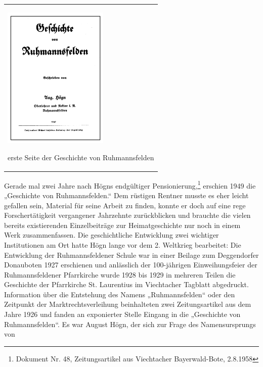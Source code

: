 \begin{flushleft}
\tablefirsthead{}
\tablehead{}
\tabletail{}
\tablelasttail{}
\begin{supertabular}{m{5.2310004cm}}

\begin{center}

\includegraphics[width=4.995cm,height=6.833cm]{pictures/zulassungsarbeit-img040.png}

\end{center}
erste Seite der Geschichte von
Ruhmannsfelden\\
\end{supertabular}
\end{flushleft}
Gerade mal zwei Jahre nach Högns endgültiger Pensionierung,\footnote{
Dokument Nr. 48, Zeitungsartikel aus Viechtacher Bayerwald-Bote,
2.8.1958} erschien 1949 die „Geschichte von Ruhmannsfelden.“ Dem
rüstigen Rentner musste es eher leicht gefallen sein, Material für
seine Arbeit zu finden, konnte er doch auf eine rege Forschertätigkeit
vergangener Jahrzehnte zurückblicken und brauchte die vielen bereits
existierenden Einzelbeiträge zur Heimatgeschichte nur noch in einem
Werk zusammenfassen. Die geschichtliche Entwicklung zwei wichtiger
Institutionen am Ort hatte Högn lange vor dem 2. Weltkrieg bearbeitet:
Die Entwicklung der Ruhmannsfeldener Schule war in einer Beilage zum
Deggendorfer Donauboten 1927 erschienen und anlässlich der 100-jährigen
Einweihungsfeier der Ruhmannsfeldener Pfarrkirche wurde 1928 bis 1929
in mehreren Teilen die Geschichte der Pfarrkirche St. Laurentius im
Viechtacher Tagblatt abgedruckt. Information über die Entstehung des
Namens „Ruhmannsfelden“ oder den Zeitpunkt der Marktrechtsverleihung
beinhalteten zwei Zeitungsartikel aus dem Jahre 1926 und fanden an
exponierter Stelle Eingang in die „Geschichte von Ruhmannsfelden“. Es
war August Högn, der sich zur Frage des Namensursprungs von
